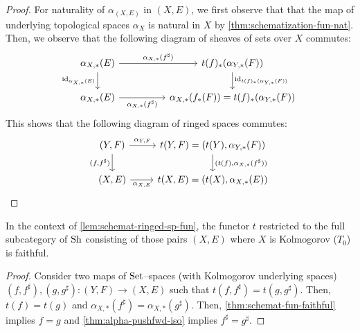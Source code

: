 \begin{proof}
For naturality of $\alpha_{(X, E)}$ in $(X, E)$, we first observe that
that the map of underlying topological spaces $\alpha_X$ is natural in $X$
by \cref{thm:schematization-fun-nat}.
Then, we observe that the following diagram of sheaves of sets
over $X$ commutes:
\[\begin{tikzcd}[column sep=huge]
\alpha_{X, *}(E)
    \ar[r, "\alpha_{X, *}(f^\sharp)"]
    \ar[d, "\id_{\alpha_{X, *}(E)}" left] &
t(f)_*(\alpha_{Y, *}(F)) \ar[d, "\id_{t(f)_*(\alpha_{Y, *}(F))}"] \\
\alpha_{X, *}(E) \ar[r, "\alpha_{X, *}(f^\sharp)" below] &
\alpha_{X, *}(f_*(F)) = t(f)_*(\alpha_{Y, *}(F))
\end{tikzcd}\]
This shows that the following diagram of ringed spaces commutes:
\[\begin{tikzcd}
(Y, F) \ar[r, "\alpha_{Y, F}"] \ar[d, "{(f, f^\sharp)}" left] &
t(Y, F) = (t(Y), \alpha_{Y, *}(F))
    \ar[d, "{(t(f), \alpha_{X, *}(f^\sharp))}"] \\
(X, E) \ar[r, "\alpha_{X, E}" below] &
t(X, E) = (t(X), \alpha_{X, *}(E))
\end{tikzcd}\]
\end{proof}

\begin{thm}\label{thm:schemat-ringed-sp-faithful}
In the context of \cref{lem:schemat-ringed-sp-fun}, the functor $t$
restricted to the full subcategory of $\mathrm{Sh}$ consisting of those pairs
$(X, E)$ where $X$ is Kolmogorov ($T_0$) is faithful.
\end{thm}
\begin{proof}
Consider two maps of $\mathrm{Set}$--spaces (with Kolmogorov underlying spaces)
$(f, f^\sharp), (g, g^\sharp) : (Y, F) \to (X, E)$ such that
$t(f, f^\sharp) = t(g, g^\sharp)$. Then,
$t(f) = t(g)$ and $\alpha_{X, *}(f^\sharp) = \alpha_{X, *}(g^\sharp)$.
Then, \cref{thm:schemat-fun-faithful} implies $f = g$ and
\cref{thm:alpha-pushfwd-iso} implies $f^\sharp = g^\sharp$.
\end{proof}

